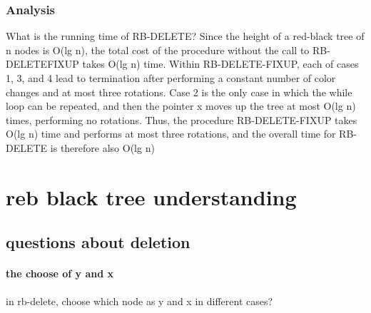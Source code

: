 \documentclass[UTF8,11pt,openany]{ctexbook}
\begin{document}
\subsection{Analysis}
What is the running time of RB-DELETE? Since the height of a red-black tree of n
nodes is O(lg n), the total cost of the procedure without the call to RB-DELETEFIXUP takes O(lg n) time. Within RB-DELETE-FIXUP, each of cases 1, 3, and 4
lead to termination after performing a constant number of color changes and at
most three rotations. Case 2 is the only case in which the while loop can be repeated, and then the pointer x moves up the tree at most O(lg n) times, performing
no rotations. Thus, the procedure RB-DELETE-FIXUP takes O(lg n) time and performs at most three rotations, and the overall time for RB-DELETE is therefore
also O(lg n)



 
\chapter{reb black tree understanding}
\section{questions about deletion}
\subsubsection{the choose of y and x}
in rb-delete, choose which node as y and x in different cases?
\vspace{-10pt}
\end{document}

